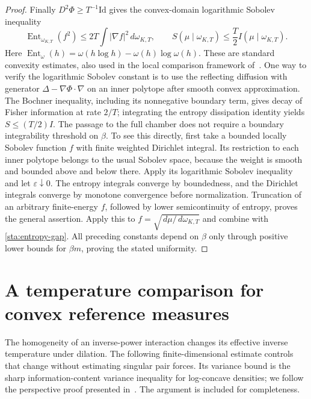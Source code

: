 \documentclass[11pt,reqno]{amsart}
\numberwithin{equation}{section}
\theoremstyle{definition}
\newcommand{\1}{\mathbf 1}
\newcommand{\dd}{\,d}
\DeclareMathOperator{\Ent}{Ent}
\begin{document}
\begin{proof}
Finally $D^2\Phi\ge T^{-1}\mathrm{Id}$ gives the convex-domain
logarithmic Sobolev inequality
\begin{equation}\label{sta:lsi}
\Ent_{\omega_{K,T}}(f^2)
\le2T\int|\nabla f|^2\dd\omega_{K,T},
\qquad
S(\mu\mid\omega_{K,T})\le\frac T2 I(\mu\mid\omega_{K,T}).
\end{equation}
Here $\Ent_\omega(h)=\omega(h\log h)-\omega(h)\log\omega(h)$.
These are standard convexity estimates, also used in the local
comparison framework of~\cite{BEY}. One way to verify the logarithmic
Sobolev constant is to use the reflecting diffusion
with generator $\Delta-\nabla\Phi\cdot\nabla$ on an inner polytope
after smooth convex approximation. The Bochner inequality, including
its nonnegative boundary term, gives decay of Fisher information at
rate $2/T$; integrating the entropy dissipation identity yields
$S\le(T/2)I$.
The passage to the full chamber does not require a boundary
integrability threshold on $\beta$. To see this directly, first take
a bounded locally Sobolev function $f$ with finite weighted Dirichlet
integral. Its restriction to each inner polytope belongs to the usual
Sobolev space, because the weight is smooth and bounded above and
below there. Apply its logarithmic Sobolev inequality and let
$\varepsilon\downarrow0$. The entropy integrals converge by
boundedness, and the Dirichlet integrals converge by monotone
convergence before normalization. Truncation of an arbitrary
finite-energy $f$, followed by lower semicontinuity of entropy, proves
the general assertion. Apply this to
$f=\sqrt{\dd\mu/\dd\omega_{K,T}}$ and combine with
\eqref{sta:entropy-gap}. All preceding constants depend on $\beta$
only through positive lower bounds for $\beta m$, proving the stated
uniformity.
\end{proof}

\section{A temperature comparison for convex reference measures}
\label{sta:sec-temperature}

The homogeneity of an inverse-power interaction changes its effective
inverse temperature under dilation. The following finite-dimensional
estimate controls that change without estimating singular pair forces.
Its variance bound is the sharp information-content variance inequality
for log-concave densities; we follow the perspective proof presented
in~\cite{FMW}. The argument is included for completeness.
\end{document}
